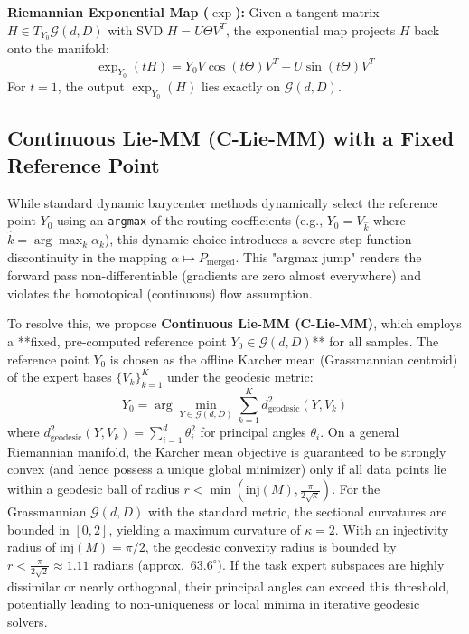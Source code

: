 \textbf{Riemannian Exponential Map ($\exp$):} Given a tangent matrix $H \in T_{Y_0} \mathcal{G}(d, D)$ with SVD $H = U \Theta V^T$, the exponential map projects $H$ back onto the manifold:
\begin{equation}
    \exp_{Y_0}(t H) = Y_0 V \cos(t \Theta) V^T + U \sin(t \Theta) V^T
\end{equation}
For $t=1$, the output $\exp_{Y_0}(H)$ lies exactly on $\mathcal{G}(d, D)$.

\subsection{Continuous Lie-MM (C-Lie-MM) with a Fixed Reference Point}
While standard dynamic barycenter methods dynamically select the reference point $Y_0$ using an \texttt{argmax} of the routing coefficients (e.g., $Y_0 = V_{\hat{k}}$ where $\hat{k} = \arg\max_k \alpha_k$), this dynamic choice introduces a severe step-function discontinuity in the mapping $\alpha \mapsto P_{\text{merged}}$. This "argmax jump" renders the forward pass non-differentiable (gradients are zero almost everywhere) and violates the homotopical (continuous) flow assumption.

To resolve this, we propose \textbf{Continuous Lie-MM (C-Lie-MM)}, which employs a **fixed, pre-computed reference point $Y_0 \in \mathcal{G}(d, D)$** for all samples. 
The reference point $Y_0$ is chosen as the offline Karcher mean (Grassmannian centroid) of the expert bases $\{V_k\}_{k=1}^K$ under the geodesic metric:
\begin{equation}
    Y_0 = \arg\min_{Y \in \mathcal{G}(d, D)} \sum_{k=1}^K d^2_{\text{geodesic}}(Y, V_k)
\end{equation}
where $d_{\text{geodesic}}^2(Y, V_k) = \sum_{i=1}^d \theta_i^2$ for principal angles $\theta_i$. On a general Riemannian manifold, the Karcher mean objective is guaranteed to be strongly convex (and hence possess a unique global minimizer) only if all data points lie within a geodesic ball of radius $r < \min\left(\text{inj}(M), \frac{\pi}{2 \sqrt{\kappa}}\right)$. For the Grassmannian $\mathcal{G}(d, D)$ with the standard metric, the sectional curvatures are bounded in $[0, 2]$, yielding a maximum curvature of $\kappa = 2$. With an injectivity radius of $\text{inj}(M) = \pi/2$, the geodesic convexity radius is bounded by $r < \frac{\pi}{2\sqrt{2}} \approx 1.11$ radians (approx.\ $63.6^\circ$). If the task expert subspaces are highly dissimilar or nearly orthogonal, their principal angles can exceed this threshold, potentially leading to non-uniqueness or local minima in iterative geodesic solvers.

